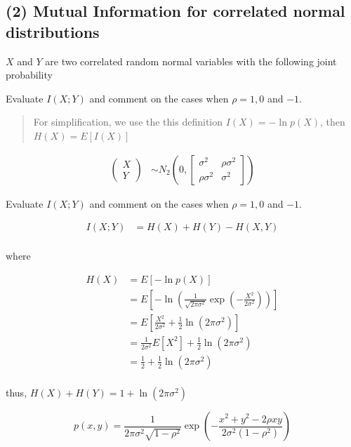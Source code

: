 \hypertarget{mutual-information-for-correlated-normal-distributions}{%
\subsection{(2) Mutual Information for correlated normal
distributions}\label{mutual-information-for-correlated-normal-distributions}}

\(X\) and \(Y\) are two correlated random normal variables with the
following joint probability

Evaluate \(I(X; Y)\) and comment on the cases when \(\rho = 1, 0\) and
\(-1\).

\begin{quote}
For simplification, we use the this definition \(I(X)=-\ln{p(X)}\), then
\(H(X)=E[I(X)]\)
\end{quote}

\[
\begin{aligned}
\begin{pmatrix}
X\\
Y
\end{pmatrix}
&\sim
N_2\left(0,
\begin{bmatrix}
\sigma^2&\rho\sigma^2\\
\rho\sigma^2&\sigma^2
\end{bmatrix}
\right)
\end{aligned}
\]

Evaluate \(I(X; Y)\) and comment on the cases when \(\rho = 1, 0\) and
\(-1\).

\[
\begin{aligned}
I(X; Y)
&=H(X)+H(Y)-H(X,Y)\\
\end{aligned}
\]

where

\[
\begin{aligned}
H(X)
&=E[-\ln p(X)]\\
&=E\left[-\ln\left(\frac{1}{\sqrt{2\pi\sigma^2}}\exp\left(-\frac{X^2}{2\sigma^2}\right)\right)\right]\\
&=E\left[\frac{X^2}{2\sigma^2}+\frac12\ln(2\pi\sigma^2)\right]\\
&=\frac1{2\sigma^2}E[X^2]+\frac12\ln(2\pi\sigma^2)\\
&=\frac12+\frac12\ln(2\pi\sigma^2)\\
\end{aligned}
\]

thus, \(H(X)+H(Y)=1+\ln(2\pi\sigma^2)\)

\[
p(x,y)=\frac{1}{2\pi\sigma^2\sqrt{1-\rho^2}}\exp\left(-\frac{x^2+y^2-2\rho xy}{2\sigma^2(1-\rho^2)}\right)
\]

